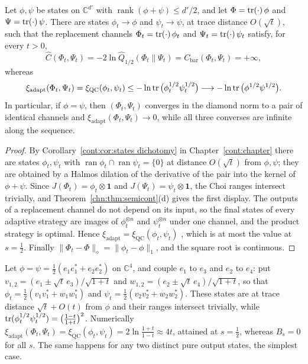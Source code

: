 \begin{theorem}\label{chn:thm:fragile}
Let $\phi,\psi$ be states on $\mathbb C^{d'}$ with $\operatorname{rank}(\phi+\psi)\le d'/2$, and let $\Phi=\operatorname{tr}(\cdot)\,\phi$ and $\Psi=\operatorname{tr}(\cdot)\,\psi$. There are states $\phi_t\to\phi$ and $\psi_t\to\psi$, at trace distance $O(\sqrt t)$, such that the replacement channels $\Phi_t=\operatorname{tr}(\cdot)\,\phi_t$ and $\Psi_t=\operatorname{tr}(\cdot)\,\psi_t$ satisfy, for every $t>0$,
\[
\widehat C(\Phi_t,\Psi_t)=-2\ln\widehat Q_{1/2}(\Phi_t\|\Psi_t)=C_{\mathrm{bar}}(\Phi_t,\Psi_t)=+\infty,
\]
whereas
\[
\xi_{\mathrm{adapt}}(\Phi_t,\Psi_t)=\xi_{\mathrm{QC}}(\phi_t,\psi_t)\le-\ln\operatorname{tr}\big(\phi_t^{1/2}\psi_t^{1/2}\big)\longrightarrow-\ln\operatorname{tr}\big(\phi^{1/2}\psi^{1/2}\big).
\]
In particular, if $\phi=\psi$, then $(\Phi_t,\Psi_t)$ converges in the diamond norm to a pair of identical channels and $\xi_{\mathrm{adapt}}(\Phi_t,\Psi_t)\to0$, while all three converses are infinite along the sequence.
\end{theorem}

\begin{proof}
By Corollary~\ref{cont:cor:states dichotomy} in Chapter~\ref{cont:chapter} there are states $\phi_t,\psi_t$ with $\operatorname{ran}\phi_t\cap\operatorname{ran}\psi_t=\{0\}$ at distance $O(\sqrt t)$ from $\phi,\psi$; they are obtained by a Halmos dilation of the derivative of the pair into the kernel of $\phi+\psi$. Since $J(\Phi_t)=\phi_t\otimes\mathbf 1$ and $J(\Psi_t)=\psi_t\otimes\mathbf 1$, the Choi ranges intersect trivially, and Theorem~\ref{chn:thm:semicont}(d) gives the first display. The outputs of a replacement channel do not depend on its input, so the final states of every adaptive strategy are images of $\phi_t^{\otimes n}$ and $\psi_t^{\otimes n}$ under one channel, and the product strategy is optimal. Hence $\xi_{\mathrm{adapt}}=\xi_{\mathrm{QC}}(\phi_t,\psi_t)$ \cite{AudenaertChernoff2007,NussbaumSzkola2009}, which is at most the value at $s=\frac12$. Finally $\|\Phi_t-\Phi\|_\diamond=\|\phi_t-\phi\|_1$, and the square root is continuous.
\end{proof}

\begin{example}\label{chn:ex:fragile}
Let $\phi=\psi=\frac12(e_1e_1^*+e_2e_2^*)$ on $\mathbb C^4$, and couple $e_1$ to $e_3$ and $e_2$ to $e_4$: put $v_{1,2}=(e_1\pm\sqrt t\,e_3)/\sqrt{1+t}$ and $w_{1,2}=(e_2\pm\sqrt t\,e_4)/\sqrt{1+t}$, so that $\phi_t=\frac12(v_1v_1^*+w_1w_1^*)$ and $\psi_t=\frac12(v_2v_2^*+w_2w_2^*)$. These states are at trace distance $\sqrt t+O(t)$ from $\phi$ and their ranges intersect trivially, while $\operatorname{tr}(\phi_t^{1/2}\psi_t^{1/2})=\big(\frac{1-t}{1+t}\big)^2$. Numerically $\xi_{\mathrm{adapt}}(\Phi_t,\Psi_t)=\xi_{\mathrm{QC}}(\phi_t,\psi_t)=2\ln\frac{1+t}{1-t}\approx4t$, attained at $s=\frac12$, whereas $B_s=0$ for all $s$. The same happens for any two distinct pure output states, the simplest case.
\end{example}

